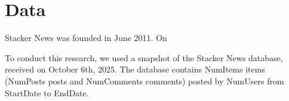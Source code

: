 \section{Data} \label{sec_data}

Stacker News was founded in June 2011. On 

To conduct this research, we used a snapshot of the Stacker News database, received on October 6th, 2025. The database contains NumItems items (NumPosts posts and NumComments comments) posted by NumUsers from StartDate to EndDate. 